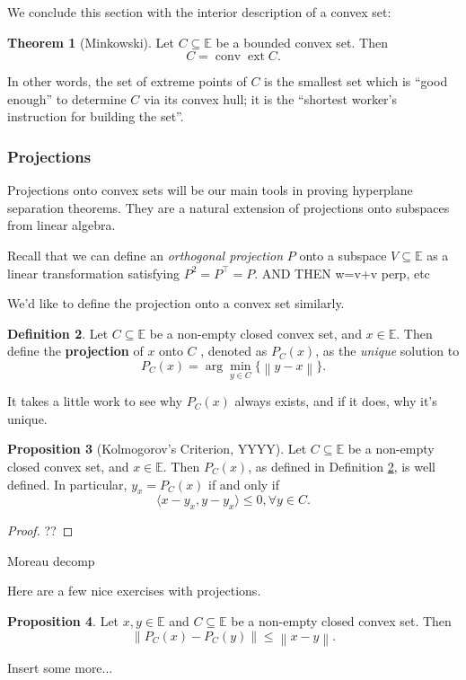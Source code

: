 \documentclass[11pt]{article}
\numberwithin{equation}{section}
\theoremstyle{definition}
\newtheorem{theorem}{Theorem}[section]
\newtheorem{proposition}[theorem]{Proposition}
\newtheorem{definition}[theorem]{Definition}%
\newcommand{\bE}{\mathbb{E}}
\newcommand{\norm}[1]{\left\lVert#1\right\rVert}
\newcommand{\conv}{\operatorname{conv}}
\newcommand{\ext}{\operatorname{ext}}
\begin{document}
We conclude this section with the interior description of a convex set:
\begin{theorem}[Minkowski]
    Let $C\subseteq\bE$ be a bounded convex set. Then
    \begin{equation}
        C = \conv\ext C.
    \end{equation}
\end{theorem}
In other words, the set of extreme points of $C$ is the smallest set which is ``good enough'' to determine $C$ via its convex hull; it is the ``shortest worker's instruction for building the set''. 
\subsubsection{Projections}
Projections onto convex sets will be our main tools in proving hyperplane separation theorems. They are a natural extension of projections onto subspaces from linear algebra.

Recall that we can define an \textit{orthogonal projection} $P$ onto a subspace $V\subseteq\bE$ as a linear transformation satisfying $P^2=P^\top=P$. AND THEN w=v+v perp, etc

We'd like to define the projection onto a convex set similarly.
\begin{definition}
    \label{defprojectioncvx}%
    Let $C\subseteq\bE$ be a non-empty closed convex set, and $x\in\bE$. Then define the \textbf{projection} of $x$ onto $C$ , denoted as $P_C(x)$, as the \textit{unique} solution to
    \begin{equation}
        P_C(x)=\arg\min_{y\in C}\{\norm{y-x}\}.
    \end{equation}
\end{definition}
It takes a little work to see why $P_C(x)$ always exists, and if it does, why it's unique. 
\begin{proposition}[Kolmogorov's Criterion, YYYY]
    Let $C\subseteq\bE$ be a non-empty closed convex set, and $x\in\bE$. Then $P_C(x)$, as defined in Definition \ref{defprojectioncvx}, is well defined. In particular, $y_x=P_C(x)$ if and only if
    \begin{equation}
        \langle x-y_x, y-y_x\rangle\le0, \forall y\in C.
    \end{equation}
\end{proposition}
\begin{proof}
??
\end{proof}

Moreau decomp

Here are a few nice exercises with projections.
\begin{proposition}
    Let $x,y\in\bE$ and $C\subseteq\bE$ be a non-empty closed convex set. Then
    \begin{equation}
        \norm{P_C(x)-P_C(y)} \le \norm{x-y}.
    \end{equation}
\end{proposition}
Insert some more...
\end{document}
